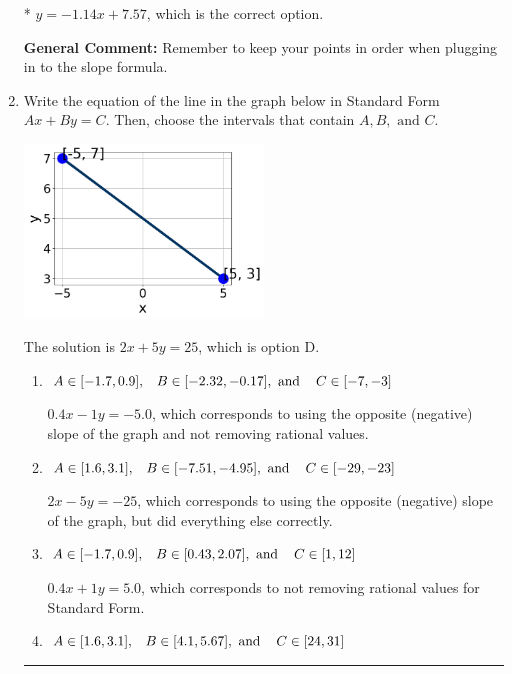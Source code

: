 \documentclass{extbook}[14pt]
\newcommand{\litem}[1]{\item #1

\rule{\textwidth}{0.4pt}}
\begin{document}
\begin{enumerate}
{\begin{enumerate}[label=\Alph*.]
* $y = -1.14x + 7.57$, which is the correct option.
\end{enumerate}

\textbf{General Comment:} Remember to keep your points in order when plugging in to the slope formula.
}
\litem{
Write the equation of the line in the graph below in Standard Form $Ax+By=C$. Then, choose the intervals that contain $A, B, \text{ and } C$.

\begin{center}
    \includegraphics[width=0.5\textwidth]{../Figures/linearGraphToStandardA.png}
\end{center}


The solution is \( 2x + 5y = 25 \), which is option D.\begin{enumerate}[label=\Alph*.]
\item \( A \in [-1.7, 0.9], \hspace{3mm} B \in [-2.32, -0.17], \text{ and } \hspace{3mm} C \in [-7, -3] \)

 $0.4x - 1y = -5.0$, which corresponds to using the opposite (negative) slope of the graph and not removing rational values.
\item \( A \in [1.6, 3.1], \hspace{3mm} B \in [-7.51, -4.95], \text{ and } \hspace{3mm} C \in [-29, -23] \)

 $2x - 5y = -25$, which corresponds to using the opposite (negative) slope of the graph, but did everything else correctly.
\item \( A \in [-1.7, 0.9], \hspace{3mm} B \in [0.43, 2.07], \text{ and } \hspace{3mm} C \in [1, 12] \)

 $0.4x + 1y = 5.0$, which corresponds to not removing rational values for Standard Form.
\item \( A \in [1.6, 3.1], \hspace{3mm} B \in [4.1, 5.67], \text{ and } \hspace{3mm} C \in [24, 31] \)


\end{enumerate}}
\end{enumerate}
\end{document}
